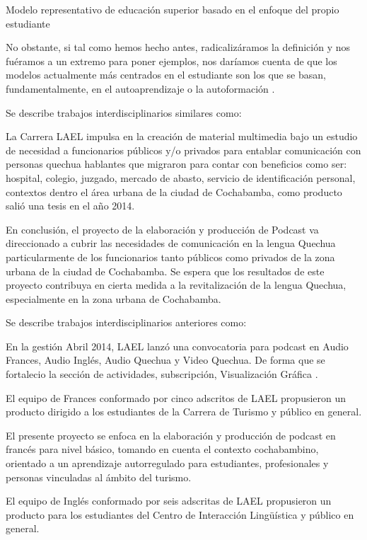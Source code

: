 Modelo representativo de educaci\'{o}n superior basado en el enfoque del propio
estudiante

No obstante, si tal como hemos hecho antes, radicaliz\'{a}ramos la definici\'{o}n
y nos fu\'{e}ramos a un extremo para poner ejemplos, nos dar\'{i}amos cuenta de
que los modelos actualmente m\'{a}s centrados en el estudiante son los que se 
basan, fundamentalmente, en el autoaprendizaje o la autoformaci\'{o}n
.\cite{duart2000aprender}

Se describe trabajos interdisciplinarios similares como: 

La Carrera LAEL impulsa en la creaci\'{o}n de material multimedia bajo un 
estudio de necesidad a funcionarios p\'{u}blicos y/o privados para entablar 
comunicaci\'{o}n con personas quechua hablantes que migraron para contar con
beneficios como ser: hospital, colegio, juzgado, mercado de abasto, servicio de
identificaci\'{o}n personal, contextos dentro el \'{a}rea urbana de la ciudad 
de Cochabamba, como producto sali\'{o} una tesis en el a\~{n}o 2014.

En conclusi\'{o}n, el proyecto de la elaboraci\'{o}n y producci\'{o}n de Podcast
va direccionado a cubrir las necesidades de comunicaci\'{o}n en la lengua Quechua
particularmente de los funcionarios tanto p\'{u}blicos como privados de la zona
urbana de la ciudad de Cochabamba. Se espera que los resultados de este proyecto
contribuya en cierta medida a la revitalizaci\'{o}n de la lengua Quechua,
especialmente en la zona urbana de Cochabamba.\cite{CHLMV2014}

Se describe trabajos interdisciplinarios anteriores como:

En la gesti\'{o}n Abril 2014, LAEL lanz\'{o} una convocatoria para podcast en
Audio Frances, Audio Ingl\'{e}s, Audio Quechua y Video Quechua. De forma que se
fortalecio la secci\'{o}n de actividades, subscripci\'{o}n, Visualizaci\'{o}n
Gr\'{a}fica .

El equipo de Frances conformado por cinco adscritos de LAEL propusieron un
producto dirigido a los estudiantes de la Carrera de Turismo y p\'{u}blico en general.

El presente proyecto se enfoca en la elaboraci\'{o}n y producci\'{o}n de podcast
en franc\'{e}s para nivel b\'{a}sico, tomando en cuenta el contexto cochabambino,
orientado a un aprendizaje autorregulado para estudiantes, profesionales y 
personas vinculadas al \'{a}mbito del turismo. \cite{CMNPZ2015}

El equipo de Ingl\'{e}s conformado por seis adscritas de LAEL propusieron un
producto para los estudiantes del Centro de Interacci\'{o}n Ling\"{u}\'{i}stica
y p\'{u}blico en general.

